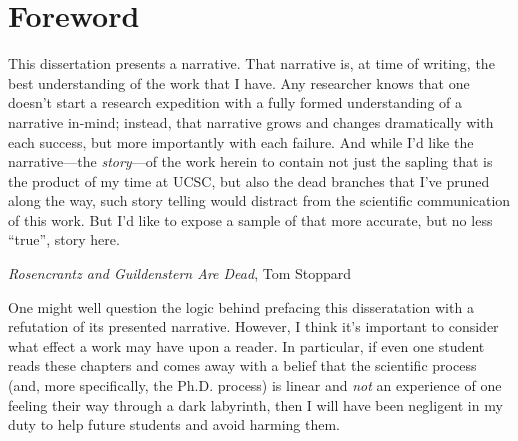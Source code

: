 
\begingroup
\let\clearpage\relax
\let\cleardoublepage\relax
\let\cleardoublepage\relax
\chapter*{Foreword}



This dissertation presents a narrative. That narrative is, at time of writing, the best understanding of the work that I
have. Any researcher knows that one doesn't start a research expedition with a fully formed understanding of a narrative
in-mind; instead, that narrative grows and changes dramatically with each success, but more importantly with each
failure. And while I'd like the narrative---the \emph{story}---of the work herein to contain not just the sapling that is the
product of my time at UCSC, but also the dead branches that I've pruned along the way, such story telling would distract
from the scientific communication of this work. But I'd like to expose a sample of that more accurate, but no less ``true'',
story here.

{\emph{Rosencrantz and Guildenstern Are Dead}, Tom Stoppard}

One might well question the logic behind prefacing this disseratation with a refutation of its presented narrative.
However, I think it's important to consider what effect a work may have upon a reader. In particular, if even one
student reads these chapters and comes away with a belief that the scientific process (and, more specifically, the Ph.D.
process) is linear and \emph{not} an experience of one feeling their way through a dark labyrinth, then I will have been
negligent in my duty to help future students and avoid harming them.


